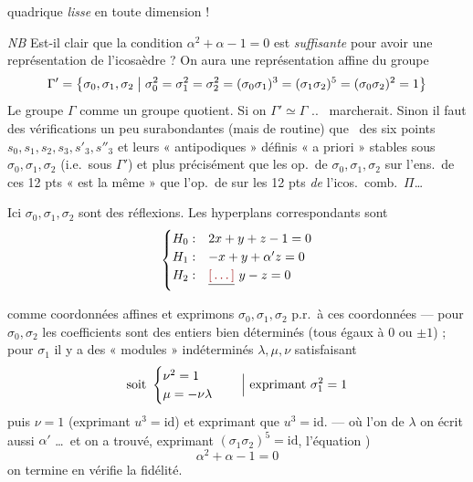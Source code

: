\documentclass[11pt,a4paper]{article}
\begin{document}
 quadrique \emph{lisse} en toute dimension !

\emph{NB} Est-il clair que la condition $\alpha^2 + \alpha - 1 = 0$ est \emph{suffisante} pour avoir une représentation de l'icosaèdre ? On aura une représentation affine du groupe
\[
\Gamma' = \bigl\{\sigma_0, \sigma_1, \sigma_2 \bigm| \sigma_0^2 = \sigma_1^2 = \sigma_2^2 = (\sigma_0\sigma_1)^3 = (\sigma_1\sigma_2)^5 = (\sigma_0\sigma_2)^2 = 1\bigr\}
\]
Le groupe \struck{\ill{}}  $\Gamma$ comme un groupe quotient. Si on   $\Gamma' \simeq \Gamma$ ..\  marcherait. Sinon il faut des vérifications un peu surabondantes (mais de  routine) que \ des six points $s_0, s_1, s_2, s_3, s'_3, s''_3$ et  leurs « antipodiques » définis « a priori »  stables sous $\sigma_0, \sigma_1, \sigma_2$ (i.e.\ sous $\Gamma'$) et  plus précisément que les op.\ de $\sigma_0, \sigma_1, \sigma_2$ sur l'ens.\ de ces 12 pts « est la même » que l'op.\ de  sur les 12 pts \emph{de} l'icos.\ comb.\ $\Pi$\ldots

Ici $\sigma_0, \sigma_1, \sigma_2$ sont des réflexions. Les hyperplans correspondants sont \struck{\ill{}}
\[
\begin{cases}
H_0 : & 2x + y + z - 1 = 0 \\
H_1 : & -x + y + \alpha' z = 0 \\
H_2 : & \struck{\ill{}}\ y - z = 0
\end{cases}
\]

comme coordonnées affines et \struck{\ill{}} exprimons $\sigma_0, \sigma_1, \sigma_2$ p.r.\ à ces coordonnées — pour $\sigma_0, \sigma_2$ les coefficients sont des entiers bien déterminés (tous égaux à $0$ ou $\pm 1$) ; pour $\sigma_1$ il y a des « modules » indéterminés $\lambda, \mu, \nu$ satisfaisant
\[
\text{soit}\ \begin{cases} \nu^2 = 1 \\ \mu = -\nu\lambda \end{cases} \quad \Bigl|\ \text{exprimant } \sigma_1^2 = 1
\]
puis $\nu = 1$ (exprimant $u^3 = \mathrm{id}$) et \struck{\ill{}}    exprimant que $u^3 = \mathrm{id}$.
\struck{$\mu = -\lambda$ (\ill{} \ill{})} — où l'on de $\lambda$ on écrit aussi $\alpha'$ \ldots\ et on a trouvé, exprimant $(\sigma_1\sigma_2)^5 = \mathrm{id}$, l'équation )
\[
\alpha^2 + \alpha - 1 = 0
\]
on termine en \ill{} \ill{} \ill{} \ill{} vérifie la fidélité.
\end{document}
